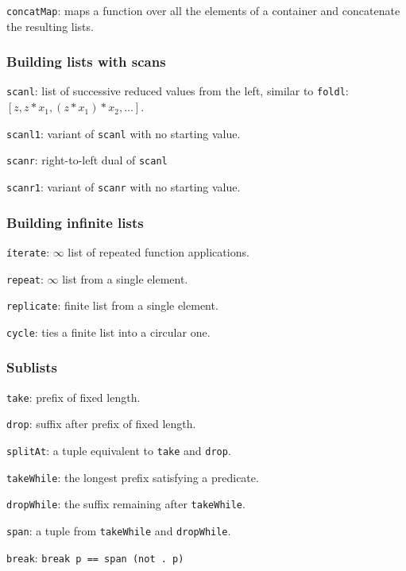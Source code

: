 \documentclass[a4paper, twoside, 8pt]{extarticle}
\begin{document}
\begin{multicols*}{3}
\texttt{concatMap}: maps a function over all the elements of a container and concatenate the resulting lists.

\subsubsection{Building lists with scans}
\texttt{scanl}: list of successive reduced values from the left, similar to \texttt{foldl}: $[z, z * x_1, (z * x_1) * x_2, \ldots]$.

\texttt{scanl1}: variant of \texttt{scanl} with no starting value.

\texttt{scanr}: right-to-left dual of \texttt{scanl}

\texttt{scanr1}: variant of \texttt{scanr} with no starting value.

\subsubsection{Building infinite lists}
\texttt{íterate}: $\infty$ list of repeated function applications.

\texttt{repeat}: $\infty$ list from a single element.

\texttt{replicate}: finite list from a single element.

\texttt{cycle}: ties a finite list into a circular one.

\subsubsection{Sublists}
\texttt{take}: prefix of fixed length.

\texttt{drop}: suffix after prefix of fixed length.

\texttt{splitAt}: a tuple equivalent to \texttt{take} and \texttt{drop}.

\texttt{takeWhile}: the longest prefix satisfying a predicate.

\texttt{dropWhile}: the suffix remaining after \texttt{takeWhile}. 

\texttt{span}: a tuple from \texttt{takeWhile} and \texttt{dropWhile}.

\texttt{break}: \texttt{break p == span (not . p)}


\end{multicols*}
\end{document}

